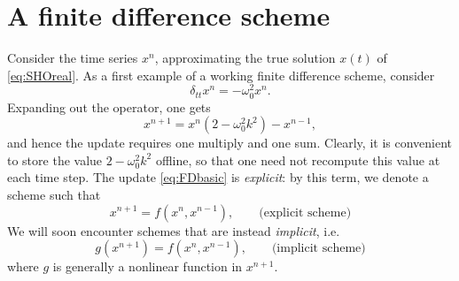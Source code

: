\documentclass[11pt,twoside,a4paper,english]{book}
\newcommand{\dtt}{\delta_{tt}}
\begin{document}



\section{A finite difference scheme}

Consider the time series $x^n$, approximating the true solution $x(t)$ of \eqref{eq:SHOreal}. As a first example of a working finite difference scheme, consider
\begin{equation}\label{eq:Scheme1}
    \dtt x^n = -\omega_0^2 x^n.
\end{equation}
Expanding out the operator, one gets 
\begin{equation}\label{eq:FDbasic}
    x^{n+1} = x^n(2-\omega_0^2 k^2) - x^{n-1},
\end{equation}
and hence the update requires one multiply and one sum. Clearly, it is convenient to store the value $2-\omega_0^2 k^2$ offline, so that one need not  recompute this value at each time step. The update \eqref{eq:FDbasic} is \emph{explicit}: by this term, we denote a scheme such that
\begin{equation}
    x^{n+1} = f(x^n,x^{n-1}), \qquad \text{(explicit scheme)}
\end{equation}
We will soon encounter schemes that are instead \emph{implicit}, i.e. 
\begin{equation}\label{eq:ImplSchemeDef}
    g(x^{n+1})= f(x^n,x^{n-1}), \qquad \text{(implicit scheme)}
\end{equation}
where $g$ is generally a nonlinear function in  $x^{n+1}$.
\end{document}
